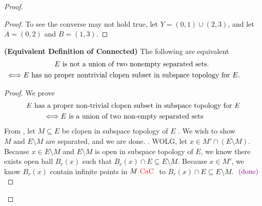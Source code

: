 \documentclass{report}
\begin{document}
\begin{proof}
\begin{proof}
To see the converse may not hold true, let $Y=(0,1)\cup (2,3)$, and let $A=(0,2)$ and $B=(1,3)$. 
\end{proof}
\begin{theorem}
\label{3.4.4}
\textbf{(Equivalent Definition of Connected)} The following are equivalent
\begin{gather}
E\text{ is not a union of two nonempty separated sets. }\\
\liff E\text{ has no proper nontrivial clopen subset in subspace topology for $E$. }
\end{gather}
\end{theorem}
\begin{proof}
We prove
\begin{gather}
E\text{ has a proper non-trivial clopen subset in subspace topology for $E$}\\
\liff E\text{ is a union of two non-empty separated sets }
\end{gather}
From , let $M\subseteq E$ be clopen in subspace topology of $E$ . We wish to show $M\text{ and }E\setminus M$ are separated, and we are done. . WOLG, let $x\in M'\cap (E\setminus M)$.\\

 Because  $x\in E\setminus M$ and $E\setminus M$ is open in subspace topology of $E$, we know there exists open ball $B_r(x)$ such that $B_r(x)\cap E\subseteq E\setminus M$. Because  $x\in M'$, we know $B_r(x)$ contain infinite points in $M\text{ \textcolor{red}{CaC} }$ to $B_r(x)\cap E\subseteq E\setminus M$. $\textcolor{violet}{\text{ (done) }}$\\



\end{proof}
\end{proof}
\end{document}
